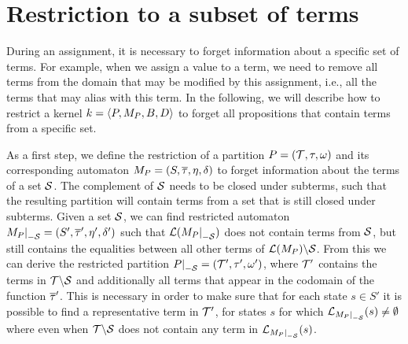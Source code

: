 \section{Restriction to a subset of terms}

During an assignment, it is necessary to forget information about a specific set of terms.
For example, when we assign a value to a term, we need to remove all terms from the domain that may be modified by this assignment, i.e., all the terms that may alias with this term.
In the following, we will describe how to restrict a kernel $k = \langle P, M_P, B, D\rangle$
to forget all propositions that contain terms from a specific set.

As a first step, we define the restriction of a partition $P = (\mathcal{T}, \tau, \omega)$ and its corresponding automaton $M_P = (S, \overline{\tau}, \eta, \delta)$ to forget information about the terms of a set $\mathcal{S}$.
The complement of $\mathcal{S}$ needs to be closed under subterms, such that the
resulting partition will contain terms from a set that is still closed under subterms. 
Given a set $\mathcal{S}$, we can find restricted
automaton $\restr{M_P}{-\Set} = (S', \otau', \eta', \delta')$ such that $\L(\restr{M_P}{-\Set})$ does not contain terms from
$\mathcal{S}$, but still contains the equalities between all other terms of $\mathcal{L}(M_P) \backslash \mathcal{S}$.
From this we can derive the restricted partition $\restr{P}{-\Set} = (\T', \tau', \omega')$, where $\mathcal{T}'$ contains
the terms in $\mathcal{T} \backslash \mathcal{S}$ and additionally all terms that appear in the codomain of the function $\overline{\tau}'$.
This is necessary in order to make sure that for each state $s \in S'$ it is possible to find a representative term in $\mathcal{T}'$,
for states $s$ for which $\L_{\restr{M_P}{-\Set}}(s) \neq \emptyset$ where
even when $\mathcal{T} \backslash \mathcal{S}$ does not contain any term in $\L_{\restr{M_P}{-\Set}}(s)$.


